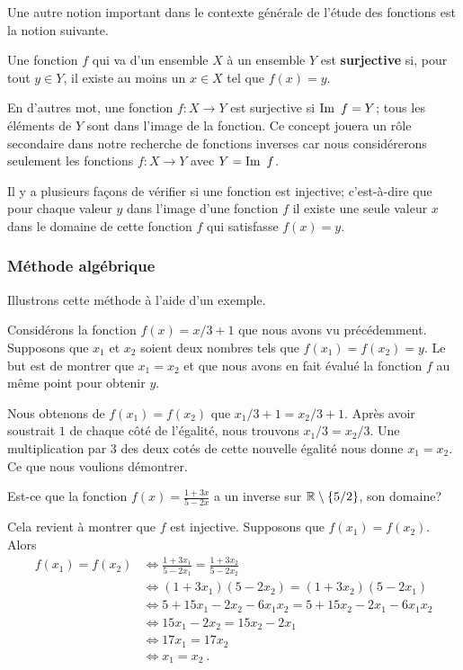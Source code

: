 {Une autre notion important dans le contexte générale de l'étude des
fonctions est la notion suivante.

\begin{focus}{\dfn} 
Une fonction $f$ qui va d'un ensemble $X$ à un ensemble $Y$ est
{\bfseries surjective} si, pour tout
$y \in Y$, il existe au moins un $x \in X$ tel que $f(x) = y$.
\end{focus}

En d'autres mot, une fonction $f: X \to Y$ est surjective si
$\IM f = Y$; tous les éléments de $Y$ sont dans l'image de la fonction.
Ce concept jouera un rôle secondaire dans notre recherche de
fonctions inverses car nous considérerons seulement les fonctions
$f : X \to Y$ avec $Y = \IM f$.

Il y a plusieurs façons de vérifier si une fonction est injective;
c'est-à-dire que pour chaque valeur $y$ dans l'image d'une fonction
$f$ il existe une seule valeur $x$ dans le domaine de cette fonction
$f$ qui satisfasse $f(x) = y$.

\subsubsection{Méthode algébrique}

Illustrons cette méthode à l'aide d'un exemple.

\begin{egg}
Considérons la fonction $f(x) = x/3 +1$ que nous avons vu précédemment.
Supposons que $x_1$ et $x_2$ soient deux nombres tels que
$f(x_1) = f(x_2) = y$.  Le but est de montrer que $x_1 = x_2$ et que
nous avons en fait évalué la fonction $f$ au même point pour obtenir
$y$.

Nous obtenons de $f(x_1) = f(x_2)$ que $x_1/3  + 1 = x_2/3 +1$.
Après avoir soustrait $1$ de chaque côté de l'égalité, nous trouvons
$x_1/3 = x_2/3$.  Une multiplication par $3$ des deux cotés de cette
nouvelle égalité nous donne $x_1 = x_2$.  Ce que nous voulions
démontrer.
\end{egg}

\begin{egg}
Est-ce que la fonction $\displaystyle f(x) = \frac{1+3x}{5-2x}$ a un
inverse sur $\mathbb{R} \setminus \{5/2\}$, son domaine?

Cela revient à montrer que $f$ est injective.  Supposons que
$f(x_1) = f(x_2)$.  Alors
\begin{align*}
f(x_1) = f(x_2) & \Leftrightarrow \frac{1+3x_1}{5-2x_1}
= \frac{1+3x_2}{5-2x_2} \\
&\Leftrightarrow (1+3x_1)(5-2x_2) = (1+3x_2)(5-2x_1) \\
&\Leftrightarrow 5+15x_1-2x_2 -6 x_1x_2 = 5+ 15 x_2 -2x_1 - 6x_1 x_2 \\
&\Leftrightarrow 15x_1-2x_2= 15 x_2 -2x_1 \\
&\Leftrightarrow 17x_1 = 17 x_2 \\
&\Leftrightarrow x_1 = x_2  \ .
\end{align*}
\label{invEGG}
\end{egg}

}
